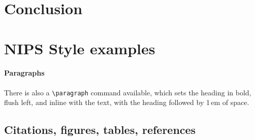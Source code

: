 \documentclass{article}
\begin{document}

\section{Conclusion}

\section{NIPS Style examples}

\paragraph{Paragraphs}

There is also a \verb+\paragraph+ command available, which sets the
heading in bold, flush left, and inline with the text, with the
heading followed by 1\,em of space.

\subsection{Citations, figures, tables, references}
\label{others}
\end{document}

